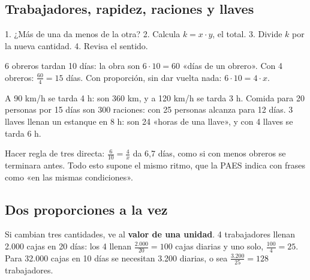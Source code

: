 \subsection{Trabajadores, rapidez, raciones y llaves}
\begin{clave}[Método] 1. ¿Más de una da menos de la otra? 2. Calcula $k = x\cdot y$, el total. 3. Divide $k$ por la nueva cantidad. 4. Revisa el sentido.\end{clave}
\begin{ejemplo}[Trabajadores] 6 obreros tardan 10 días: la obra son $6\cdot 10 = 60$ «días de un obrero». Con 4 obreros: $\frac{60}{4} = 15$ días. Con proporción, sin dar vuelta nada: $6\cdot 10 = 4\cdot x$.\end{ejemplo}
\begin{ejemplo} A 90 km/h se tarda 4 h: son 360 km, y a 120 km/h se tarda 3 h. Comida para 20 personas por 15 días son 300 raciones: con 25 personas alcanza para 12 días. 3 llaves llenan un estanque en 8 h: son 24 «horas de una llave», y con 4 llaves se tarda 6 h.\end{ejemplo}
\begin{ojo} Hacer regla de tres directa: $\frac{6}{10} = \frac{4}{x}$ da 6,7 días, como si con menos obreros se terminara antes. Todo esto supone el mismo ritmo, que la PAES indica con frases como «en las mismas condiciones».\end{ojo}

\subsection{Dos proporciones a la vez}
Si cambian tres cantidades, ve al \textbf{valor de una unidad}. 4 trabajadores llenan 2.000 cajas en 20 días: los 4 llenan $\frac{2.000}{20} = 100$ cajas diarias y uno solo, $\frac{100}{4} = 25$. Para 32.000 cajas en 10 días se necesitan 3.200 diarias, o sea $\frac{3.200}{25} = 128$ trabajadores.

